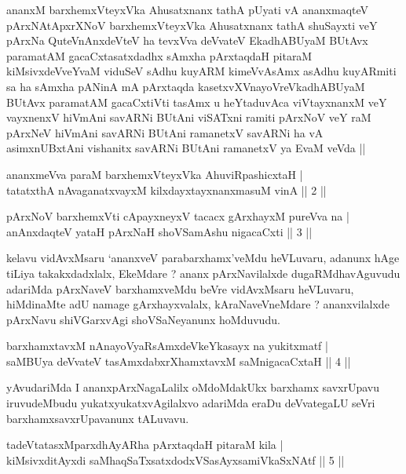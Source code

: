 \begin{shl}
ananxM barxhemxVteyxVka Ahusatxnanx tathA pUyati vA ananxmaqteV pArxNAtApxrXNoV barxhemxVteyxVka Ahusatxnanx tathA shuSayxti veY pArxNa QuteV\s nAnxdeVteV ha tevxVva deVvateV EkadhABUyaM BUtAvx paramatAM gacaCxtasatxdadhx sAmxha pArxtaqdaH pitaraM kiMsivxdeVveYvaM viduSeV sAdhu kuyARM kimeVvAsAmx asAdhu kuyARmiti sa ha sAmxha pANinA mA pArxtaqda kasetxvXVnayoVreVkadhABUyaM BUtAvx paramatAM gacaCxtiVti tasAmx u heYtaduvAca viVtayxnanxM veY vayxnenxV hiVmAni savARNi BUtAni viSATxni ramiti pArxNoV veY raM pArxNeV hiVmAni savARNi BUtAni ramanetxV savARNi ha vA asimxnUBxtAni vishanitx savARNi BUtAni ramanetxV ya EvaM veVda ||
\end{shl}


\begin{shl}
ananxmeVva paraM barxhemxVteyxVka AhuviRpashicxtaH | \\
tatatxthA nAvaganatxvayxM kilxdayxtayxnanxmasuM vinA \hfill ||  2 ||
\end{shl}

\begin{shl}
pArxNoV barxhemxVti cApayxneyxV tacacx gArxhayxM pureVva na | \\
anAnxdaqteV yataH pArxNaH shoVSamAshu nigacaCxti \hfill ||  3 || 
\end{shl}

\begin{artha}
kelavu vidAvxMsaru `ananxveV parabarxhamx'veMdu heVLuvaru, adanunx hAge tiLiya takakxdadxlalx, EkeMdare ? ananx pArxNavilalxde dugaRMdhavAguvudu adariMda pArxNaveV barxhamxveMdu beVre vidAvxMsaru heVLuvaru, hiMdinaMte adU namage gArxhayxvalalx, kAraNaveVneMdare ? ananxvilalxde pArxNavu shiVGarxvAgi shoVSaNeyanunx hoMduvudu.
\end{artha}

\begin{shl}
barxhamxtavxM nAnayoVyaRsAmxdeVkeYkasayx na yukitxmatf | \\
saMBUya deVvateV tasAmxdabxrXhamxtavxM saMnigacaCxtaH \hfill ||  4 || 
\end{shl}

\begin{artha}
yAvudariMda I ananxpArxNagaLalilx oMdoMdakUkx barxhamx savxrUpavu iruvudeMbudu yukatxyukatxvAgilalxvo adariMda eraDu deVvategaLU seVri barxhamxsavxrUpavanunx tALuvavu.
\end{artha}

\begin{shl}
tadeVtatasxMparxdhAyAR\s \s ha pArxtaqdaH pitaraM kila | \\
kiMsivxditAyxdi saMhaqSaTxsatxdodxVSasAyxsamiVkaSxNAtf \hfill ||  5 || 
\end{shl}

